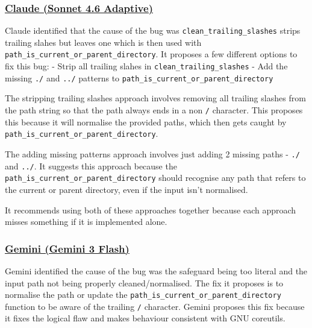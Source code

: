 \hypertarget{claude-sonnet-4.6-adaptive}{%
\subsubsection{\texorpdfstring{\href{https://claude.ai/share/7e50c827-5c7d-4b5b-967f-08524e29c423}{Claude
(Sonnet 4.6
Adaptive)}}{Claude (Sonnet 4.6 Adaptive)}}\label{claude-sonnet-4.6-adaptive}}

Claude identified that the cause of the bug was
\texttt{clean\_trailing\_slashes} strips trailing slahes but leaves one
which is then used with
\texttt{path\_is\_current\_or\_parent\_directory}. It proposes a few
different options to fix this bug: - Strip all trailing slahes in
\texttt{clean\_trailing\_slashes} - Add the missing \texttt{./} and
\texttt{../} patterns to
\texttt{path\_is\_current\_or\_parent\_directory}

The stripping trailing slashes approach involves removing all trailing
slashes from the path string so that the path always ends in a non
\texttt{/} character. This proposes this because it will normalise the
provided paths, which then gets caught by
\texttt{path\_is\_current\_or\_parent\_directory}.

The adding missing patterns approach involves just adding 2 missing
paths - \texttt{./} and \texttt{../}. It suggests this approach because
the \texttt{path\_is\_current\_or\_parent\_directory} should recognise
any path that refers to the current or parent directory, even if the
input isn't normalised.

It recommends using both of these approaches together because each
approach misses something if it is implemented alone.

\hypertarget{gemini-gemini-3-flash}{%
\subsubsection{\texorpdfstring{\href{https://gemini.google.com/share/eb2352e5b683}{Gemini
(Gemini 3
Flash)}}{Gemini (Gemini 3 Flash)}}\label{gemini-gemini-3-flash}}

Gemini identified the cause of the bug was the safeguard being too
literal and the input path not being properly cleaned/normalised. The
fix it proposes is to normalise the path or update the
\texttt{path\_is\_current\_or\_parent\_directory} function to be aware
of the trailing \texttt{/} character. Gemini proposes this fix because
it fixes the logical flaw and makes behaviour consistent with GNU
coreutils.

